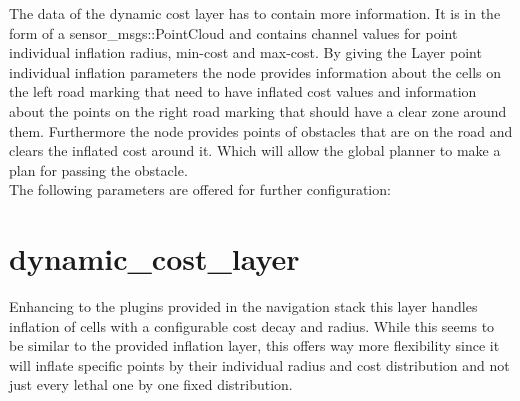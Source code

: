 The data of the dynamic cost layer has to contain more information. It is in the form of a sensor\_msgs::PointCloud and contains channel values for point individual inflation radius, min-cost and max-cost. By giving the Layer point individual inflation parameters the node provides information about the cells on the left road marking that need to have inflated cost values and information about the points on the right road marking that should have a clear zone around them. Furthermore the node provides points of obstacles that are on the road and clears the inflated cost around it. Which will allow the global planner to make a plan for passing the obstacle.\\

The following parameters are offered for further configuration:

\begin{table}[H]
\centering
{}

\caption{MarkeFreeSpace parameters}
\label{markfreespaceparams}
\end{table}

\section{dynamic\_cost\_layer}
Enhancing to the plugins provided in the navigation stack this layer handles inflation of cells with a configurable cost decay and radius. While this seems to be similar to the provided inflation layer, this offers way more flexibility since it will inflate specific points by their individual radius and cost distribution and not just every lethal one by one fixed distribution.\\

